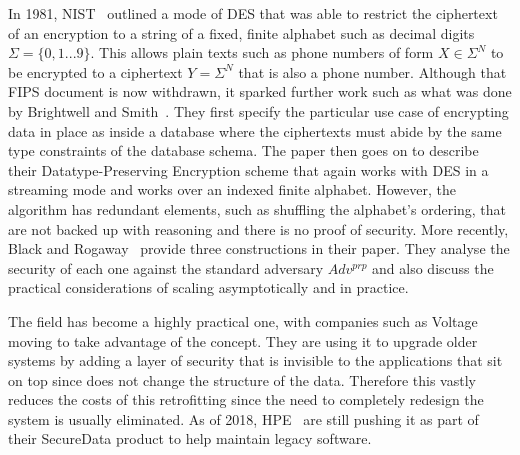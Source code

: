 \documentclass[ %
                    author={Samuel Russell},
                supervisor={Prof. Bogdan Warinschi},
                    degree={MEng},
                     title={Innocuous Ciphertexts},
                  subtitle={The DE-CENSOR Scheme},
                      type={Research},
                      year={2018} ]{dissertation}
\begin{document}
In 1981, NIST~\cite{FIPS74} outlined a mode of DES that was able to restrict the ciphertext of an encryption to a string of a fixed, finite alphabet such as decimal digits $ \Sigma = \{0,1...9\} $. This allows plain texts such as phone numbers of form $ X \in \Sigma^N $ to be encrypted to a ciphertext $ Y = \Sigma^N $ that is also a phone number. Although that FIPS document is now withdrawn, it sparked further work such as what was done by Brightwell and Smith~\cite{DPE}. They first specify the particular use case of encrypting data in place as inside a database where the ciphertexts must abide by the same type constraints of the database schema. The paper then goes on to describe their  Datatype-Preserving Encryption scheme that again works with DES in a streaming mode and works over an indexed finite alphabet. However, the algorithm has redundant elements, such as shuffling the alphabet's ordering, that are not backed up with reasoning and there is no proof of security. More recently, Black and Rogaway~\cite{CAFD} provide three constructions in their paper. They analyse the security of each one against the standard adversary $Adv^{prp}$ and also discuss the practical considerations of scaling asymptotically and in practice.

The field has become a highly practical one, with companies such as Voltage moving to take advantage of the concept. They are using it to upgrade older systems by adding a layer of security that is invisible to the applications that sit on top since does not change the structure of the data. Therefore this vastly reduces the costs of this retrofitting since the need to completely redesign the system is usually eliminated. As of 2018, HPE~\cite{hp} are still pushing it as part of their SecureData product to help maintain legacy software.
\end{document}
